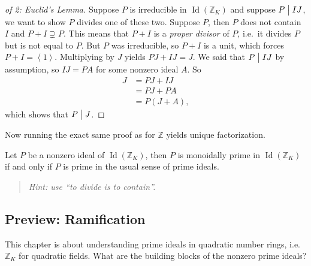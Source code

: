 \begin{proof}[of 2: Euclid's Lemma]

Suppose \(P\) is irreducible in \(\operatorname{Id}({\mathbb{Z}}_K)\)
and suppose \(P \bigm|IJ\), we want to show \(P\) divides one of these
two. Suppose
\(P%
\), then \(P\) does not contain \(I\) and \(P+I \supsetneq P\). This
means that \(P+I\) is a \emph{proper divisor} of \(P\), i.e.~it divides
\(P\) but is not equal to \(P\). But \(P\) was irreducible, so \(P+I\)
is a unit, which forces \(P + I = \left\langle{ 1 }\right\rangle\).
Multiplying by \(J\) yields \(PJ + IJ = J\). We said that \(P \bigm|IJ\)
by assumption, so \(IJ = PA\) for some nonzero ideal \(A\). So
\begin{align*}
J 
&= PJ + IJ \\
&= PJ + PA \\ 
&= P(J + A)
,\end{align*}
which shows that \(P\bigm|J\).

\end{proof}

\begin{remark}

Now running the exact same proof as for \({\mathbb{Z}}\) yields unique
factorization.

\end{remark}

\begin{exercise}[?]

Let \(P\) be a nonzero ideal of \(\operatorname{Id}({\mathbb{Z}}_K)\),
then \(P\) is monoidally prime in \(\operatorname{Id}({\mathbb{Z}}_K)\)
if and only if \(P\) is prime in the usual sense of prime ideals.

\begin{quote}
\emph{Hint: use ``to divide is to contain''.}
\end{quote}

\end{exercise}

\hypertarget{preview-ramification}{%
\subsection{Preview: Ramification}\label{preview-ramification}}

\begin{remark}

This chapter is about understanding prime ideals in quadratic number
rings, i.e.~\({\mathbb{Z}}_K\) for quadratic fields. What are the
building blocks of the nonzero prime ideals?

\end{remark}

